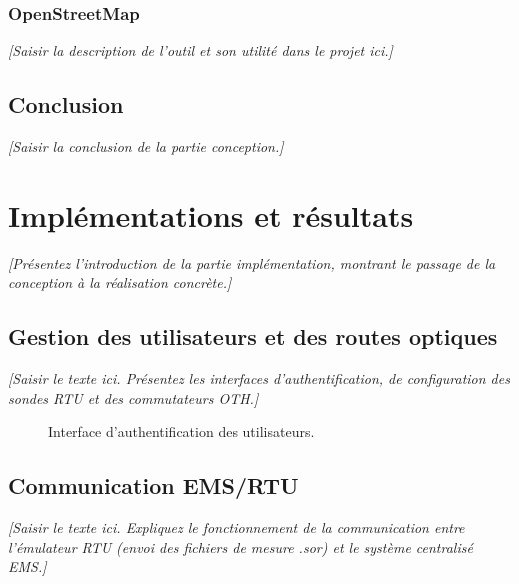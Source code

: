 \documentclass[11pt,a4paper]{article}
\begin{document}
\subsubsection{OpenStreetMap}
\textit{[Saisir la description de l'outil et son utilité dans le projet ici.]}

\subsection{Conclusion}
\textit{[Saisir la conclusion de la partie conception.]}

\newpage

\section{Implémentations et résultats}
\textit{[Présentez l'introduction de la partie implémentation, montrant le passage de la conception à la réalisation concrète.]}

\subsection{Gestion des utilisateurs et des routes optiques}
\textit{[Saisir le texte ici. Présentez les interfaces d'authentification, de configuration des sondes RTU et des commutateurs OTH.]}

\begin{figure}[H]
    \centering
    \caption{Interface d'authentification des utilisateurs.}
    \label{fig:auth}
\end{figure}

\subsection{Communication EMS/RTU}
\textit{[Saisir le texte ici. Expliquez le fonctionnement de la communication entre l'émulateur RTU (envoi des fichiers de mesure .sor) et le système centralisé EMS.]}
\end{document}
